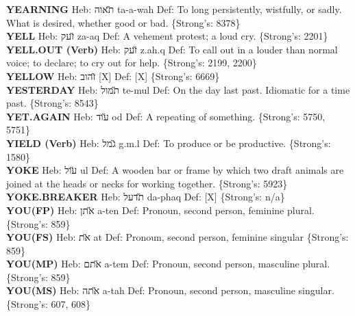 {\textbf{YEARNING} Heb: {\large\H תאוה} ta-a-wah Def: To long persistently, wistfully, or sadly. What is desired, whether good or bad. \{Strong's: 8378\}\hfill{}\\

\textbf{YELL} Heb: {\large\H זעק} za-aq Def: A vehement protest; a loud cry. \{Strong's: 2201\}\hfill{}\\

\textbf{YELL.OUT (Verb)} Heb: {\large\H זעק} z.ah.q Def: To call out in a louder than normal voice; to declare; to cry out for help. \{Strong's: 2199, 2200\}\hfill{}\\

\textbf{YELLOW} Heb: {\large\H זהוב} {[}X{]} Def: {[}X{]} \{Strong's: 6669\}\hfill{}\\

\textbf{YESTERDAY} Heb: {\large\H תמול} te-mul Def: On the day last past. Idiomatic for a time past. \{Strong's: 8543\}\hfill{}\\

\textbf{YET.AGAIN} Heb: {\large\H עוד} od Def: A repeating of something. \{Strong's: 5750, 5751\}\hfill{}\\

\textbf{YIELD (Verb)} Heb: {\large\H גמל} g.m.l Def: To produce or be productive. \{Strong's: 1580\}\hfill{}\\

\textbf{YOKE} Heb: {\large\H עול} ul Def: A wooden bar or frame by which two draft animals are joined at the heads or necks for working together. \{Strong's: 5923\}\hfill{}\\

\textbf{YOKE.BREAKER} Heb: {\large\H תדעל} da-phaq Def: {[}X{]} \{Strong's: n/a\}\hfill{}\\

\textbf{YOU(FP)} Heb: {\large\H אתן} a-ten Def: Pronoun, second person, feminine plural. \{Strong's: 859\}\hfill{}\\

\textbf{YOU(FS)} Heb: {\large\H את} at Def: Pronoun, second person, feminine singular \{Strong's: 859\}\hfill{}\\

\textbf{YOU(MP)} Heb: {\large\H אתם} a-tem Def: Pronoun, second person, masculine plural. \{Strong's: 859\}\hfill{}\\

\textbf{YOU(MS)} Heb: {\large\H אתה} a-tah Def: Pronoun, second person, masculine singular. \{Strong's: 607, 608\}\hfill{}\\

}
